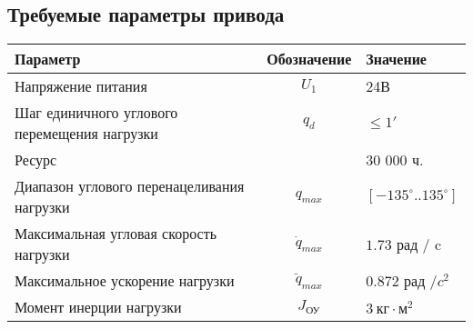 \subsection{Требуемые параметры привода}

\begin{tabular}{|l|c|l|}
    \hline
    Параметр                                    & Обозначение      & Значение                   \\
    \hline
    Напряжение питания                          & $U_1$            & 24В                        \\
    Шаг единичного углового перемещения нагрузки& $q_d$            & $ \le 1' $                 \\
    Ресурс                                      &                  & 30 000 ч.                  \\
    Диапазон углового перенацеливания нагрузки  & $q_{max}$        & $[-135^\circ .. 135^\circ] $ \\
    Максимальная угловая скорость нагрузки      & $\dot{q}_{max}$  & $1.73$ рад / c             \\
    Максимальное ускорение нагрузки             & $\ddot{q}_{max}$ & $0.872$ рад /$c^2$         \\
    Момент инерции нагрузки                     & $J_{\text{ОУ}}$  & $3 ~\text{кг} \cdot \text{м}^2 $          \\
    \hline
\end{tabular}

\endinput
